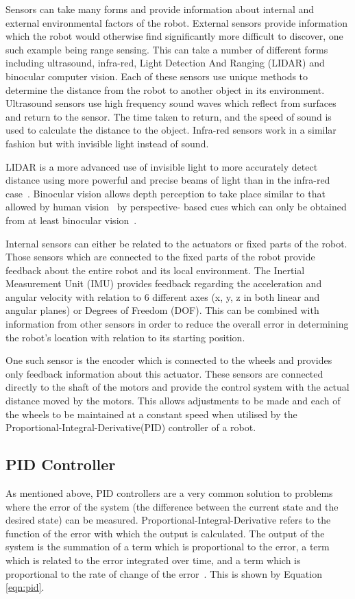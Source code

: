Sensors can take many forms and provide information about internal and external 
environmental factors of the robot. External sensors provide information which 
the robot would otherwise find significantly more difficult to discover, one 
such example being range sensing. This can take a number of different forms 
including ultrasound, infra-red, Light Detection And Ranging (LIDAR) and 
binocular computer vision. Each of these sensors use unique methods to determine 
the distance from the robot to another object in its environment. Ultrasound 
sensors use high frequency sound waves which reflect from surfaces and return 
to the sensor. The time taken to return, and the speed of sound is used to 
calculate the distance to the object. Infra-red sensors work in a similar 
fashion but with invisible light instead of sound. 

LIDAR is a more advanced use of invisible light to more accurately detect 
distance using more powerful and precise beams of light than in the infra-red 
case~\cite{lidar}. Binocular vision allows depth perception to take place 
similar to that allowed by human vision~\cite{read2005early} by perspective-
based cues which can only be obtained from at least binocular 
vision~\cite{pfautz2002depth}. 

Internal sensors can either be related to the actuators or fixed parts of the 
robot. Those sensors which are connected to the fixed parts of the robot provide 
feedback about the entire robot and its local environment. The Inertial 
Measurement Unit (IMU) provides feedback regarding the acceleration and angular 
velocity with relation to 6 different axes (x, y, z in both linear and angular 
planes) or Degrees of Freedom (DOF). This can be combined with information from 
other sensors in order to reduce the overall error in determining the robot's 
location with relation to its starting position.  

One such sensor is the encoder which is connected to the wheels and provides 
only feedback information about this actuator. These sensors are connected 
directly to the shaft of the motors and provide the control system with the 
actual distance moved by the motors. This allows adjustments to be made and each 
of the wheels to be maintained at a constant speed when utilised by the 
Proportional-Integral-Derivative(PID) controller of a robot.  

\subsection{PID Controller}\label{litreview/robotics/pid}
As mentioned above, PID controllers are a very common solution to problems where the error of the 
system (the difference between the current state and the desired state) can be 
measured. Proportional-Integral-Derivative refers to the 
function of the error with which the output is calculated. The output of the 
system is the summation of a term which is proportional to the error, a term 
which is related to the error integrated over time, and a term which is 
proportional to the rate of change of the error~\cite{aastrom2006advanced}. This is shown by Equation \ref{eqn:pid}.

